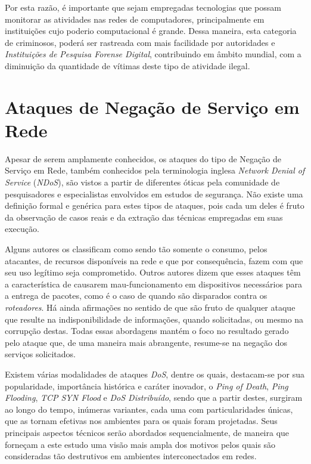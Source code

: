 Por esta razão, é importante que sejam empregadas tecnologias que possam monitorar as atividades nas redes de computadores, principalmente em instituições cujo poderio computacional é grande. Dessa maneira, esta categoria de criminosos, poderá ser rastreada com mais facilidade por autoridades e \textit{Instituições de Pesquisa Forense Digital}, contribuindo em âmbito mundial, com a diminuição da quantidade de vítimas deste tipo de atividade ilegal.

\section{Ataques de Negação de Serviço em Rede}

Apesar de serem amplamente conhecidos, os ataques do tipo de Negação de Serviço  em Rede, também conhecidos pela terminologia inglesa \textit{Network Denial of Service} (\textit{NDoS}), são vistos a partir de diferentes óticas pela comunidade de pesquisadores e especialistas envolvidos em estudos de segurança. Não existe uma definição formal e genérica para estes tipos de ataques, pois cada um deles é fruto da observação de casos reais e da extração das técnicas empregadas em suas execução.\cite{NDoS}

Alguns autores os classificam como sendo tão somente o consumo, pelos atacantes, de recursos disponíveis na rede e que por consequência, fazem com que seu uso legítimo seja comprometido. Outros autores dizem que esses ataques têm a característica de causarem mau-funcionamento em dispositivos necessários para a entrega de pacotes, como é o caso de quando são disparados contra os \textit{roteadores}. Há ainda afirmações no sentido de que são fruto de qualquer ataque que resulte na indisponibilidade de informações, quando solicitadas, ou mesmo na corrupção destas. Todas essas abordagens mantém o foco no resultado gerado pelo ataque que, de uma maneira mais abrangente, resume-se na negação dos serviços solicitados.

Existem várias modalidades de ataques \textit{DoS}, dentre os quais, destacam-se por sua popularidade, importância histórica e caráter inovador, o \textit{Ping of Death}, \textit{Ping Flooding}, \textit{TCP SYN Flood} e \textit{DoS Distribuído}, sendo que a partir destes, surgiram ao longo do tempo, inúmeras variantes, cada uma com particularidades únicas, que as tornam efetivas nos ambientes para os quais foram projetadas. Seus principais aspectos técnicos serão abordados sequencialmente, de maneira que forneçam a este estudo uma visão mais ampla dos motivos pelos quais são consideradas tão destrutivos em ambientes interconectados em redes.


